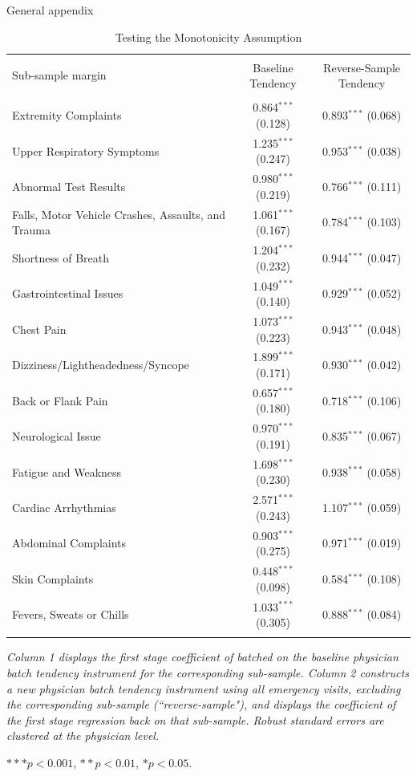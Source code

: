 \documentclass[,,nonblindrev]{informs}
\begin{document}
\begin{APPENDIX}{General appendix}
\begin{table}[!htbp]
\centering 
  \caption{Testing the Monotonicity Assumption} 
\label{tab:monotonicity}
\begin{tabular}{@{\extracolsep{5.5pt}}lcc} 
\\[-1.8ex]\hline 
\hline \\[-1.8ex] 
Sub-sample margin & Baseline Tendency  & Reverse-Sample Tendency \\ 
\hline \\[-1.8ex] 
Extremity Complaints & 0.864$^{***}$ (0.128) & 0.893$^{***}$ (0.068) \\ 
Upper Respiratory Symptoms & 1.235$^{***}$ (0.247) & 0.953$^{***}$ (0.038) \\ 
Abnormal Test Results & 0.980$^{***}$ (0.219) & 0.766$^{***}$ (0.111) \\
Falls, Motor Vehicle Crashes, Assaults, and Trauma & 1.061$^{***}$ (0.167) & 0.784$^{***}$ (0.103) \\
Shortness of Breath & 1.204$^{***}$ (0.232) & 0.944$^{***}$ (0.047) \\
Gastrointestinal Issues & 1.049$^{***}$ (0.140) & 0.929$^{***}$ (0.052) \\
Chest Pain & 1.073$^{***}$ (0.223) & 0.943$^{***}$ (0.048) \\
Dizziness/Lightheadedness/Syncope & 1.899$^{***}$ (0.171) & 0.930$^{***}$ (0.042) \\
Back or Flank Pain & 0.657$^{***}$ (0.180) & 0.718$^{***}$ (0.106) \\
Neurological Issue & 0.970$^{***}$ (0.191) & 0.835$^{***}$ (0.067) \\
Fatigue and Weakness & 1.698$^{***}$ (0.230) & 0.938$^{***}$ (0.058) \\
Cardiac Arrhythmias & 2.571$^{***}$ (0.243) & 1.107$^{***}$ (0.059) \\
Abdominal Complaints & 0.903$^{***}$ (0.275) & 0.971$^{***}$ (0.019) \\
Skin Complaints & 0.448$^{***}$ (0.098) & 0.584$^{***}$ (0.108) \\
Fevers, Sweats or Chills & 1.033$^{***}$ (0.305) & 0.888$^{***}$ (0.084) \\
\hline \\[-1.8ex] 
\end{tabular} 
\begin{tablenotes}
\small
\item \textit{Column 1 displays the first stage coefficient of batched on the baseline physician batch tendency instrument for the corresponding sub-sample. Column 2 constructs a new physician batch tendency instrument using all emergency visits, excluding the corresponding sub-sample (``reverse-sample"), and displays the coefficient of the first stage regression back on that sub-sample. Robust standard errors are clustered at the physician level.}
\item $*** p < 0.001$, $** p < 0.01$, $* p < 0.05$.
\end{tablenotes}
\end{table}


\end{APPENDIX}
\end{document}
